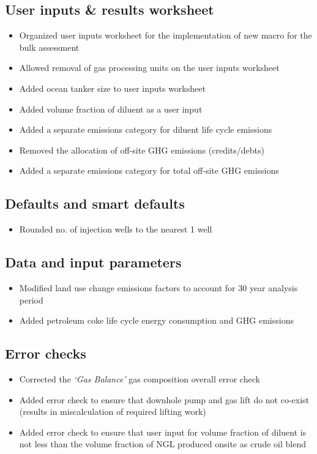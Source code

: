 \documentclass[11pt]{report}
\newcommand{\sheet}[1]{\textit{`{#1}'}}
\begin{document}
{{{{\subsection{User inputs \& results worksheet}
\begin{itemize}
\item{Organized user inputs worksheet for the implementation of new macro for the bulk assessment}
\item{Allowed removal of gas processing units on the user inputs worksheet}
\item{Added ocean tanker size to user inputs worksheet}
\item{Added volume fraction of diluent as a user input}
\item{Added a separate emissions category for diluent life cycle emissions}
\item{Removed the allocation of off-site GHG emissions (credits/debts)}
\item{Added a separate emissions category for total off-site GHG emissions}
\end{itemize}

\subsection{Defaults and smart defaults}
\begin{itemize}
\item{Rounded no. of injection wells to the nearest 1 well}
\end{itemize}

\subsection{Data and input parameters}
\begin{itemize}
\item{Modified land use change emissions factors to account for 30 year analysis period}
\item{Added petroleum coke life cycle energy consumption and GHG emissions}
\end{itemize}

\subsection{Error checks}
\begin{itemize}
\item{Corrected the \sheet{Gas Balance} gas composition overall error check}
\item{Added error check to ensure that downhole pump and gas lift do not co-exist (results in miscalculation of required lifting work)}
\item{Added error check to ensure that user input for volume fraction of diluent is not less than the volume fraction of NGL produced onsite as crude oil blend} 
\end{itemize}


}}}}
\end{document}

